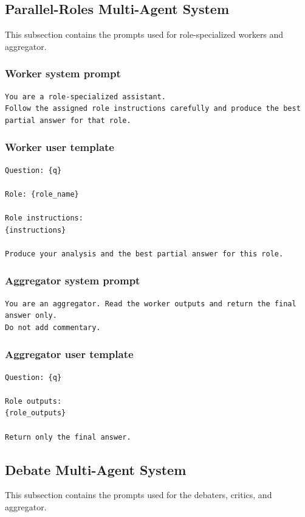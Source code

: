 \documentclass{article} %
\begin{document}
\subsection{Parallel-Roles Multi-Agent System}
This subsection contains the prompts used for role-specialized workers and aggregator.

\subsubsection{Worker system prompt}
\begin{lstlisting}[style=promptstyle]
You are a role-specialized assistant.
Follow the assigned role instructions carefully and produce the best partial answer for that role.
\end{lstlisting}

\subsubsection{Worker user template}
\begin{lstlisting}[style=promptstyle]
Question: {q}

Role: {role_name}

Role instructions:
{instructions}

Produce your analysis and the best partial answer for this role.
\end{lstlisting}

\subsubsection{Aggregator system prompt}
\begin{lstlisting}[style=promptstyle]
You are an aggregator. Read the worker outputs and return the final answer only.
Do not add commentary.
\end{lstlisting}

\subsubsection{Aggregator user template}
\begin{lstlisting}[style=promptstyle]
Question: {q}

Role outputs:
{role_outputs}

Return only the final answer.
\end{lstlisting}

\subsection{Debate Multi-Agent System}
This subsection contains the prompts used for the debaters, critics, and aggregator.
\end{document}
